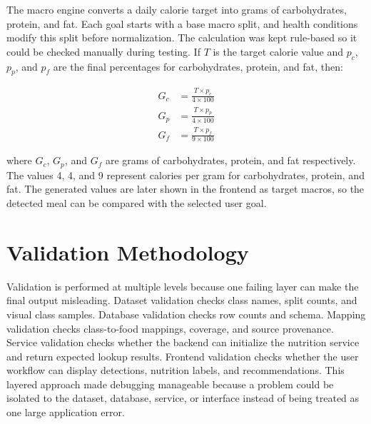 The macro engine converts a daily calorie target into grams of carbohydrates, protein, and fat. Each goal starts with a base macro split, and health conditions modify this split before normalization. The calculation was kept rule-based so it could be checked manually during testing. If $T$ is the target calorie value and $p_c$, $p_p$, and $p_f$ are the final percentages for carbohydrates, protein, and fat, then:

\begin{align}
    G_c &= \frac{T \times p_c}{4 \times 100}\\
    G_p &= \frac{T \times p_p}{4 \times 100}\\
    G_f &= \frac{T \times p_f}{9 \times 100}
\end{align}

where $G_c$, $G_p$, and $G_f$ are grams of carbohydrates, protein, and fat respectively. The values 4, 4, and 9 represent calories per gram for carbohydrates, protein, and fat. The generated values are later shown in the frontend as target macros, so the detected meal can be compared with the selected user goal.

\section{Validation Methodology}

Validation is performed at multiple levels because one failing layer can make the final output misleading. Dataset validation checks class names, split counts, and visual class samples. Database validation checks row counts and schema. Mapping validation checks class-to-food mappings, coverage, and source provenance. Service validation checks whether the backend can initialize the nutrition service and return expected lookup results. Frontend validation checks whether the user workflow can display detections, nutrition labels, and recommendations. This layered approach made debugging manageable because a problem could be isolated to the dataset, database, service, or interface instead of being treated as one large application error.
